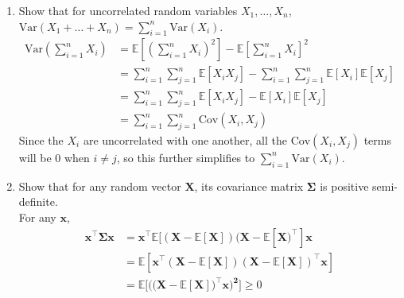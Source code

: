 \documentclass{article}
\begin{document}
\begin{enumerate}[label=\arabic*.]
{	 The continuous case has an analogous construction.
	 }
\item Show that for uncorrelated random variables $X_1, \hdots, X_n$, $\text{Var}(X_1 + \hdots + X_n) = \sum_{i = 1}^n \text{Var}(X_i)$. \\
	 {\color{blue}
	 \begin{align*}
	 \text{Var}(\sum_{i=1}^n X_i) &= \mathbb{E}[(\sum_{i=1}^n X_i)^2] - \mathbb{E}[\sum_{i=1}^n X_i]^2 \\
	 &= \sum_{i=1}^n\sum_{j=1}^n \mathbb{E}[X_iX_j] - \sum_{i=1}^n\sum_{j=1}^n \mathbb{E}[X_i]\mathbb{E}[X_j] \\
	 &= \sum_{i=1}^n\sum_{j=1}^n \mathbb{E}[X_iX_j] - \mathbb{E}[X_i]\mathbb{E}[X_j] \\
	 &= \sum_{i=1}^n\sum_{j=1}^n \text{Cov}(X_i, X_j)
	 \end{align*}
	 Since the $X_i$ are uncorrelated with one another, all the $\text{Cov}(X_i, X_j)$ terms will be 0 when $i \neq j$, so this further simplifies to $\sum_{i=1}^n \text{Var}(X_i)$.
	 }
\item Show that for any random vector $\mathbf{X}$, its covariance matrix $\mathbf{\Sigma}$ is positive semi-definite. \\
	 {\color{blue}
	 For any $\mathbf{x}$,
	 \begin{align*}
	 \mathbf{x^\top\Sigma x} &= \mathbf{x^\top}\mathbb{E}[(\mathbf{X} - \mathbb{E}[\mathbf{X}])(\mathbf{X} - \mathbb{E}[\mathbf{X})^\top]\mathbf{x} \\
	 &= \mathbb{E}[\mathbf{x^\top(X - \mathbb{E}[X])(X - \mathbb{E}[X])^\top x}] \\
	 &= \mathbb{E}[((\mathbf{X - \mathbb{E}[X])^\top x)^2]} \geq 0
	 \end{align*}
	 }
\end{enumerate}
\end{document}
